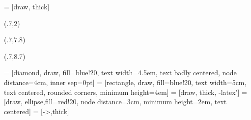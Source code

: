 \usepackage{bm,booktabs,animate,ragged2e,multicol}

\graphicspath{{../figs/}{figs/}}
\def\full#1{\vspace*{0.15cm}\centerline{\texttt{[image: \#1]}}}
\usepackage{tikz}
\usetikzlibrary{trees,shapes}
\usetikzlibrary{matrix}
 = [draw, thick]

\fontsize{13}{15}\sf
\usepackage[scale=0.85]{sourcecodepro}

{
\begin{textblock}{7.5}(.7,2)\fontsize{24}{26}\sf
{\color{white}\raggedright{}\par\inserttitle}
\end{textblock}
\begin{textblock}{7.5}(.7,7.8)
{\fontsize{13}{13}\sf\color{white}\raggedright{\insertauthor}}
\end{textblock}
\begin{textblock}{7.5}(.7,8.7)
{\fontsize{11}{11}\sf\color{DarkYellow}\insertdate}
\end{textblock}
}




\def\E{\text{E}}
\def\V{\text{Var}}
\def\up#1{\raisebox{-0.3cm}{#1}}
\def\pred#1#2#3{\hat{#1}_{#2|#3}}
\def\damped{$_\text{d}$}
\def\h+{h_{m}^{+}}
\def\st#1{\rlap{#1}\textcolor{red}{\rule{1cm}{0.1cm}}}
\def\bY{\bm{y}}
\def\by{\bm{y}}
\def\bS{\bm{S}}
\def\bI{\text{\rm\textbf{I}}}
\def\bbeta{\bm{\beta}}
\def\bSigma{\bm{\Sigma}}
\def\bW{\bm{\Sigma}}
\def\Var{\text{Var}}
\def\var{\text{Var}}
\def\bOmega{\bm{\Omega}}
\def\bLambda{\bm{\Lambda}}
\let\mc\multicolumn
\def\hl{\color[RGB]{230, 172, 0}}



\usepackage{tikz}

\usetikzlibrary{trees,shapes,arrows,matrix}
 = [diamond, draw, fill=blue!20,
    text width=4.5em, text badly centered, node distance=4cm, inner sep=0pt]
 = [rectangle, draw, fill=blue!20,
    text width=5cm, text centered, rounded corners, minimum height=4em]
 = [draw, thick, -latex']
 = [draw, ellipse,fill=red!20, node distance=3cm,
    minimum height=2em, text centered]
 = [->,thick]
